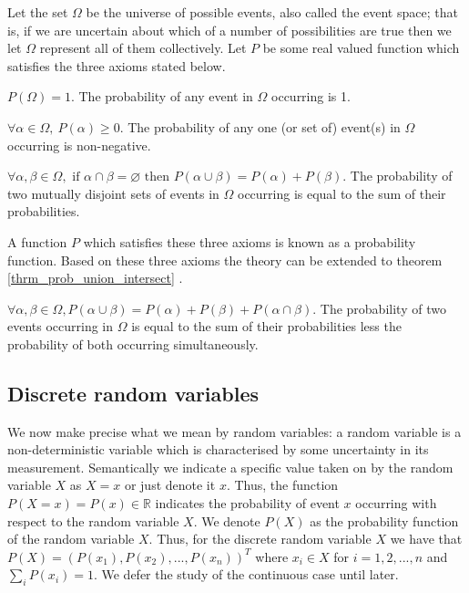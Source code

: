 Let the set $\Omega$ be the universe of possible events, also called the event space; that is, if we are uncertain about which of a number of possibilities are true then we let $\Omega$ represent all of them collectively. Let $P$ be some real valued function which satisfies the three axioms stated below.
\begin{ax}
$P(\Omega) = 1$. The probability of any event in $\Omega$ occurring is 1.
\end{ax}
\begin{ax}
$\forall \alpha \in \Omega,~P(\alpha) \geq 0$. The probability of any one (or set of) event(s) in $\Omega$ occurring is non-negative. 
\end{ax}
\begin{ax}
$\forall \alpha, \beta \in \Omega,\text{ if } \alpha \cap \beta = \varnothing \text{ then } P(\alpha \cup \beta) = P(\alpha) + P(\beta)$. The probability of two mutually disjoint sets of events in $\Omega$ occurring is equal to the sum of their probabilities.
\end{ax}
A function $P$ which satisfies these three axioms is known as a probability function. Based on these three axioms the theory can be extended to theorem \ref{thrm_prob_union_intersect} \cite{koller}.
\begin{thrm}
$\forall \alpha, \beta \in \Omega, P(\alpha \cup \beta) = P(\alpha) + P(\beta) + P(\alpha \cap \beta)$. The probability of two events occurring in $\Omega$ is equal to the sum of their probabilities less the probability of both occurring simultaneously.
\label{thrm_prob_union_intersect}
\end{thrm}

\subsection{Discrete random variables}

We now make precise what we mean by random variables: a random variable is a non-deterministic variable which is characterised by some uncertainty in its measurement. Semantically we indicate a specific value taken on by the random variable $X$ as $X=x$ or just denote it $x$. Thus, the function $P(X=x)=P(x) \in \mathbb{R}$ indicates the probability of event $x$ occurring with respect to the random variable $X$. We denote $P(X)$ as the probability function of the random variable $X$. Thus, for the discrete random variable $X$ we have that $P(X)=(P(x_1),P(x_2),...,P(x_n))^T$ where $x_i \in X$ for $i=1,2,..., n$ and $\sum_i P(x_i) =1$. We defer the study of the continuous case until later.


